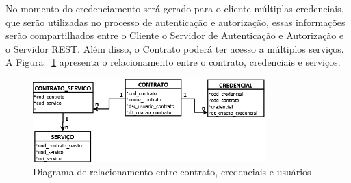 \begin{enumerate}[RQ1]
    No momento do credenciamento será gerado para o cliente múltiplas credenciais, que serão utilizadas no processo de autenticação e autorização, essas informações serão compartilhados entre o Cliente o Servidor de Autenticação e Autorização e o Servidor REST. Além disso, o Contrato poderá ter acesso a múltiplos serviços. A Figura ~\ref{fig:diagrama_relacionamento} apresenta o relacionamento entre o contrato, credenciais e serviços.

\begin{figure}[!htb]
    \centering
    \includegraphics[width=0.8\textwidth]{modelo_relacionamento_contrato1.png}
    \caption{Diagrama de relacionamento entre contrato, credenciais e usuários}
    \label{fig:diagrama_relacionamento}
\end{figure}

\end{enumerate}





